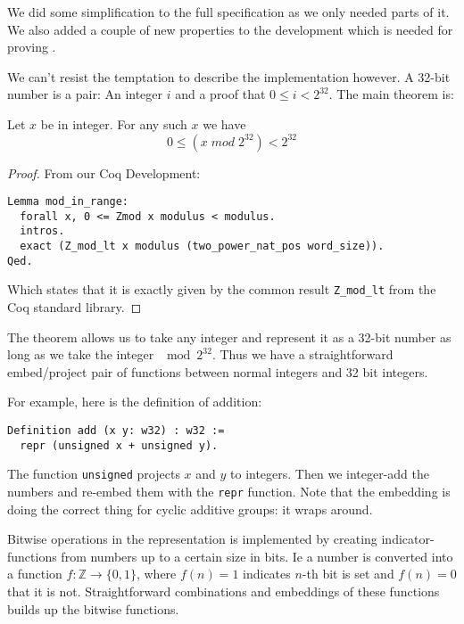 We did some simplification to the full specification as we only needed
parts of it. We also added a couple of new properties to the
development which is needed for proving \januso{}.

We can't resist the temptation to describe the implementation however. A
32-bit number is a pair: An integer $i$ and a proof that $0 \leq i <
2^{32}$. The main theorem is:
\begin{lem}
  Let $x$ be in integer. For any such $x$ we have
  \begin{equation*}
    0 \leq (x \;mod\; 2^{32}) < 2^{32}
  \end{equation*}
\end{lem}
\begin{proof}
  From our Coq Development:
\begin{verbatim}
Lemma mod_in_range:
  forall x, 0 <= Zmod x modulus < modulus.
  intros.
  exact (Z_mod_lt x modulus (two_power_nat_pos word_size)).
Qed.
\end{verbatim}
  Which states that it is exactly given by the common result
  \texttt{Z\_mod\_lt} from the Coq standard library.
\end{proof}
The theorem allows us to take any integer and represent it as a 32-bit
number as long as we take the integer $\mod 2^{32}$. Thus we have a
straightforward embed/project pair of functions between normal
integers and 32 bit integers.

For example, here is the definition of addition:
\begin{verbatim}
Definition add (x y: w32) : w32 :=
  repr (unsigned x + unsigned y).
\end{verbatim}
The function \texttt{unsigned} projects $x$ and $y$ to integers. Then
we integer-add the numbers and re-embed them with the \texttt{repr}
function. Note that the embedding is doing the correct thing for
cyclic additive groups: it wraps around.

Bitwise operations in the representation is implemented by creating
indicator-functions from numbers up to a certain size in bits. Ie a
number is converted into a function $f \colon \mathbb{Z} \to \{0,
1\}$, where $f(n) = 1$ indicates $n$-th bit is set and $f(n) = 0$
that it is not. Straightforward combinations and embeddings of these
functions builds up the bitwise functions.

